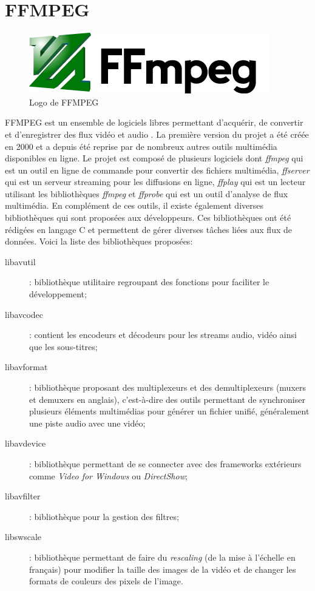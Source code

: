 \documentclass{polytech/polytech}
\begin{document}
\section{FFMPEG}

\begin{figure}
	\includegraphics[scale=0.55]{images/ffmpeg}
	\caption{Logo de FFMPEG}
	\label{fig:logoffmpeg}
\end{figure}

FFMPEG est un ensemble de logiciels libres permettant d’acquérir, de convertir et d’enregistrer des flux vidéo et audio \cite{_ffmpeg_2017}. La première version du projet a été créée en 2000 et a depuis été reprise par de nombreux autres outils multimédia disponibles en ligne. Le projet est composé de plusieurs logiciels dont \textit{ffmpeg} qui est un outil en ligne de commande pour convertir des fichiers multimédia, \textit{ffserver} qui est un serveur streaming pour les diffusions en ligne, \textit{ffplay} qui est un lecteur utilisant les bibliothèques \textit{ffmpeg} et \textit{ffprobe} qui est un outil d’analyse de flux multimédia. En complément de ces outils, il existe également diverses bibliothèques qui sont proposées aux développeurs. Ces bibliothèques ont été rédigées en langage C et permettent de gérer diverses tâches liées aux flux de données. Voici la liste des bibliothèques proposées:

\begin{description}
	\item[libavutil]: bibliothèque utilitaire regroupant des fonctions pour faciliter le développement;
	\item[libavcodec]: contient les encodeurs et décodeurs pour les streams audio, vidéo ainsi que les sous-titres;
	\item[libavformat]: bibliothèque proposant des multiplexeurs et des demultiplexeurs (muxers et demuxers en anglais), c'est-à-dire des outils permettant de synchroniser plusieurs éléments multimédias pour générer un fichier unifié, généralement une piste audio avec une vidéo;
	\item[libavdevice]: bibliothèque permettant de se connecter avec des frameworks extérieurs comme \textit{Video for Windows} ou \textit{DirectShow};
	\item[libavfilter]: bibliothèque pour la gestion des filtres;
	\item[libswscale]: bibliothèque permettant de faire du \textit{rescaling} (de la mise à l'échelle en français) pour modifier la taille des images de la vidéo et de changer les formats de couleurs des pixels de l'image.
\end{description}
\end{document}
